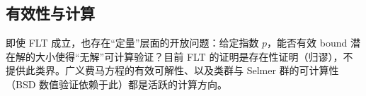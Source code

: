 \subsection{有效性与计算}

即使 FLT 成立，也存在“定量”层面的开放问题：给定指数 $p$，能否有效 bound 潜在解的大小使得“无解”可计算验证？目前 FLT 的证明是存在性证明（归谬），不提供此类界。广义费马方程的有效可解性、以及类群与 Selmer 群的可计算性（BSD 数值验证依赖于此）都是活跃的计算方向。

